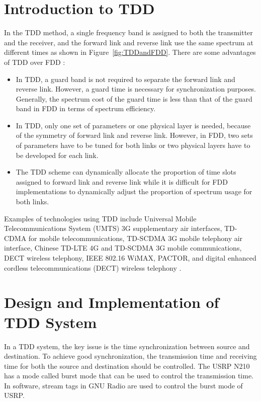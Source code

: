 \section{Introduction to TDD}
In the TDD method, a single frequency band is assigned to both the transmitter and the receiver, and the forward link and reverse link use the same spectrum at different times as shown in Figure~\ref{fig:TDDandFDD}. There are some advantages of TDD over FDD \cite{MoonbLinkTDDFDD}:
\begin{itemize}

\item In TDD, a guard band is not required to separate the forward link and reverse link. However, a guard time is necessary for synchronization purposes. Generally, the spectrum cost of the guard time is less than that of the guard band in FDD in terms of spectrum efficiency.

\item In TDD, only one set of parameters or one physical layer is needed, because of the symmetry of forward link and reverse link. However, in FDD, two sets of parameters have to be tuned for both links or two physical layers have to be developed for each link.

\item The TDD scheme can dynamically allocate the proportion of time slots assigned to forward link and reverse link while it is difficult for FDD implementations to dynamically adjust the proportion of spectrum usage for both links.
\end{itemize}

Examples of technologies using TDD include Universal Mobile Telecommunications System (UMTS) 3G supplementary air interfaces, TD-CDMA for mobile telecommunications, TD-SCDMA 3G mobile telephony air interface, Chinese TD-LTE 4G and TD-SCDMA 3G mobile communications, DECT wireless telephony, IEEE 802.16 WiMAX, PACTOR, and digital enhanced cordless telecommunications (DECT) wireless telephony \cite{wikipediaDuplex, TechoPediaTDD}.

\section{Design and Implementation of TDD System}
In a TDD system, the key issue is the time synchronization between source and destination. To achieve good synchronization, the transmission time and receiving time for both the source and destination should be controlled. The USRP N210 has a mode called burst mode that can be used to control the transmission time. In software, stream tags in GNU Radio are used to control the burst mode of USRP.
